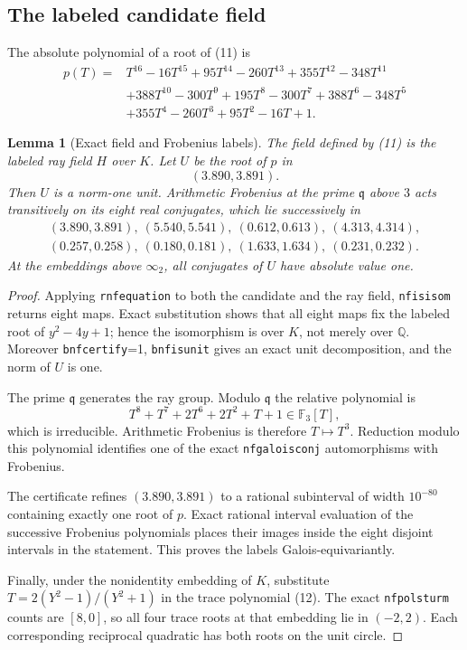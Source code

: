 \documentclass[11pt]{article}
\newtheorem{lemma}[theorem]{Lemma}
\newcommand{\Q}{\mathbb Q}
\begin{document}
\subsection{The labeled candidate field}

The absolute polynomial of a root of (11) is
\[
\begin{aligned}
p(T)={}&T^{16}-16T^{15}+95T^{14}-260T^{13}+355T^{12}
-348T^{11}\\
&+388T^{10}-300T^9+195T^8-300T^7+388T^6-348T^5\\
&+355T^4-260T^3+95T^2-16T+1.
\end{aligned}
\]

\begin{lemma}[Exact field and Frobenius labels]\label{lem:frobenius}
The field defined by (11) is the labeled ray field $H$ over $K$.
Let $U$ be the root of $p$ in
\[
 (3.890,3.891).
\]
Then $U$ is a norm-one unit.  Arithmetic Frobenius at the prime
$\mathfrak q$ above $3$ acts transitively on its eight real conjugates,
which lie successively in
\[
\begin{gathered}
(3.890,3.891),\ (5.540,5.541),\ (0.612,0.613),\
(4.313,4.314),\\
(0.257,0.258),\ (0.180,0.181),\ (1.633,1.634),\
(0.231,0.232).
\end{gathered}
\]
At the embeddings above $\infty_2$, all conjugates of $U$ have
absolute value one.
\end{lemma}

\begin{proof}
Applying \texttt{rnfequation} to both the candidate and the ray field,
\texttt{nfisisom} returns eight maps.  Exact substitution shows that
all eight maps fix the labeled root of $y^2-4y+1$; hence the
isomorphism is over $K$, not merely over $\Q$.  Moreover
\texttt{bnfcertify}=1, \texttt{bnfisunit} gives an exact unit
decomposition, and the norm of $U$ is one.

The prime $\mathfrak q$ generates the ray group.  Modulo
$\mathfrak q$ the relative polynomial is
\[
 T^8+T^7+2T^6+2T^2+T+1\in\mathbb F_3[T],
\]
which is irreducible.  Arithmetic Frobenius is therefore $T\mapsto
T^3$.  Reduction modulo this polynomial identifies one of the exact
\texttt{nfgaloisconj} automorphisms with Frobenius.

The certificate refines $(3.890,3.891)$ to a rational subinterval of
width $10^{-80}$ containing exactly one root of $p$.  Exact rational
interval evaluation of the
successive Frobenius polynomials places their images inside the eight
disjoint intervals in the statement.  This proves the labels
Galois-equivariantly.

Finally, under the nonidentity embedding of $K$, substitute
$T=2(Y^2-1)/(Y^2+1)$ in the trace polynomial (12).
The exact \texttt{nfpolsturm} counts are $[8,0]$, so all four trace
roots at that embedding lie in $(-2,2)$.  Each corresponding
reciprocal quadratic has both roots on the unit circle.
\end{proof}
\end{document}
